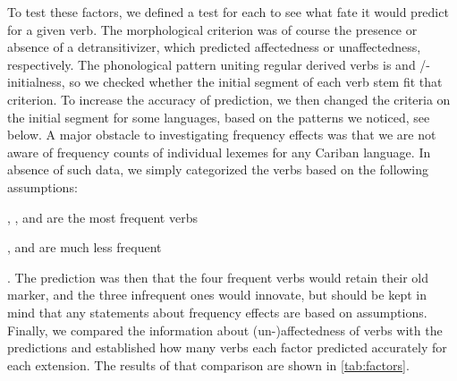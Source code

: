 To test these factors, we defined a test for each to see what fate it would predict for a given verb.
The morphological criterion was of course the presence or absence of a detransitivizer, which predicted affectedness or unaffectedness, respectively.
The phonological pattern uniting regular derived  verbs is  and /-initialness, so we checked whether the initial segment of each verb stem fit that criterion.
To increase the accuracy of prediction, we then changed the criteria on the initial segment for some languages, based on the patterns we noticed, see below.
A major obstacle to investigating frequency effects was that we are not aware of frequency counts of individual lexemes for any Cariban language.
In absence of such data, we simply categorized the verbs based on the following assumptions:
\begin{inlinelist}
	\item {}, , and  are the most frequent  verbs
	\item {},  and  are much less frequent
\end{inlinelist}.
The prediction was then that the four frequent verbs would retain their old marker, and the three infrequent ones would innovate, but should be kept in mind that any statements about frequency effects are based on assumptions.
Finally, we compared the information about (un-)affectedness of verbs  with the predictions and established how many verbs each factor predicted accurately for each extension.
The results of that comparison are shown in \cref{tab:factors}.




